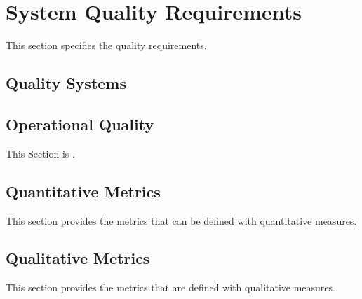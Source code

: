 \KNEADSECTIONNEWPAGE
\section{System Quality Requirements}
\label{lab:sec_Quality}



This section specifies the \ThisSys quality requirements.

\subsection{Quality Systems}
\label{lab:ssec_QualitySystems}



\subsection{Operational Quality}
\label{lab:ssec_OperationalQuality}

This Section is \TBD.


\subsection{Quantitative Metrics}
\label{lab:ssec_QuantitativeMetrics}

This section provides the metrics that can be defined with quantitative measures.




\subsection{Qualitative Metrics}
\label{lab:ssec_QualitativeMetrics}

This section provides the metrics that are defined with qualitative measures.


